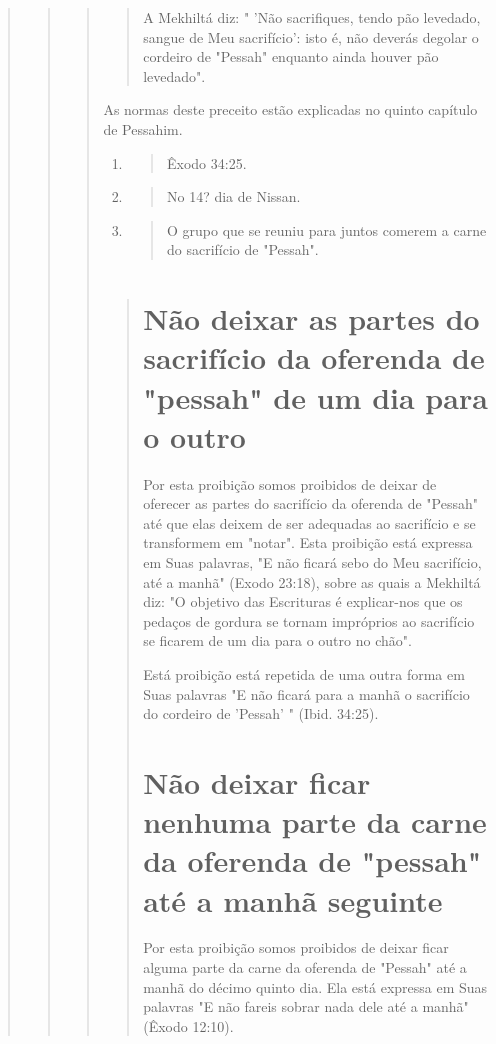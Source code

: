 \begin{quote}
\begin{quote}
\begin{quote}
\begin{quote}
A Mekhiltá diz: " 'Não sacrifiques, tendo pão levedado, sangue de Meu
sacrifício': isto é, não deverás degolar o cordeiro de "Pessah" enquanto
ainda houver pão levedado".
\end{quote}

As normas deste preceito estão explicadas no quinto capítulo de
Pessahim.

\begin{enumerate}
\def\labelenumi{\arabic{enumi}.}
\setcounter{enumi}{285}
\item
 \begin{quote}
 Êxodo 34:25.
 \end{quote}
\item
 \begin{quote}
 No 14? dia de Nissan.
 \end{quote}
\item
 \begin{quote}
 O grupo que se reuniu para juntos comerem a carne do sacrifício de
 "Pessah".
 \end{quote}
\end{enumerate}

\begin{quote}

\section{Não deixar as partes do sacrifício da oferenda de "pessah" 
de um dia para o outro}

Por esta proibição somos proibidos de deixar de oferecer as partes do
sacrifício da oferenda de "Pessah" até que elas deixem de ser adequadas
ao sacrifício e se transformem em "notar". Esta proibição está expressa
em Suas palavras, "E não ficará sebo do Meu sacrifício, até a manhã"
(Exodo 23:18), sobre as quais a Mekhiltá diz: "O objetivo das Escrituras
é explicar-nos que os pedaços de gordura se tornam impróprios ao
sacrifício se ficarem de um dia para o outro no chão".

Está proibição está repetida de uma outra forma em Suas palavras "E não
ficará para a manhã o sacrifício do cordeiro de 'Pessah' " (Ibid.
34:25).

\section{Não deixar ficar nenhuma parte da carne da oferenda de "pessah" 
até a manhã seguinte}

Por esta proibição somos proibidos de deixar ficar alguma parte da carne
da oferenda de "Pessah" até a manhã do décimo quinto dia. Ela está
ex­pressa em Suas palavras "E não fareis sobrar nada dele até a manhã"
(Êxodo 12:10).


\end{quote}
\end{quote}
\end{quote}
\end{quote}
